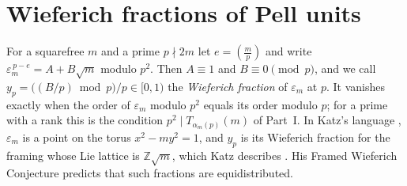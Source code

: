 \section{Wieferich fractions of Pell units}

For a squarefree $m$ and a prime $p \nmid 2m$ let $e = \left(\frac{m}{p}\right)$ and write $\varepsilon_m^{\,p - e} = A + B\sqrt m$ modulo $p^2$.
Then $A \equiv 1$ and $B \equiv 0 \pmod p$, and we call $y_p = \bigl((B/p) \bmod p\bigr)/p \in [0, 1)$ the \emph{Wieferich fraction} of
$\varepsilon_m$ at $p$. It vanishes exactly when the order of $\varepsilon_m$ modulo $p^2$ equals its order modulo $p$; for a prime with a
rank this is the condition $p^2 \mid T_{\alpha_m(p)}(m)$ of Part~I. In Katz's language \cite{Katz2015}, $\varepsilon_m$ is a point on the torus
$x^2 - m y^2 = 1$, and $y_p$ is its Wieferich fraction for the framing whose Lie lattice is $\mathbb{Z}\sqrt m$, which Katz describes
\cite[Section~6]{Katz2015}. His Framed Wieferich Conjecture \cite[Conjecture~6.1]{Katz2015} predicts that such fractions are equidistributed.

